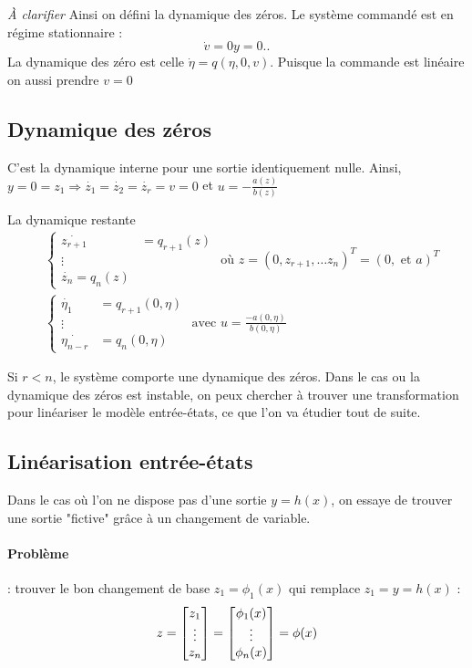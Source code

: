 \documentclass[main.tex]{subfiles}
\begin{document}
\begin{rem}\emph{ À clarifier }
Ainsi on défini la dynamique des zéros. Le système commandé est en régime stationnaire :
\[
\dot{v}=0  y=0 ..
\]
La dynamique des zéro est celle $\dot{\eta} =q(\eta,0,v)$. Puisque la commande est linéaire on aussi prendre $v=0$
\end{rem}
\subsection{Dynamique des zéros}
\begin{defin}
C'est la dynamique interne pour une sortie identiquement nulle.
Ainsi, $y = 0 = z_1 \Rightarrow \dot{z_1} = \dot{z_2} = \dot{z_r} = v = 0$ et $u = -\frac{a(z)}{b(z)}$

La dynamique restante
\begin{align*}
&\left\lbrace
\begin{array}{cc}
\dot{z_{r+1}} & = q_{r+1}(z) \\
\vdots \\
\dot{z_n} = q_n(z)
\end{array}\right. \text{ où } z = (0,z_{r+1},\dots z_n)^T = (0,\text{ et }a)^T\\
& \left\lbrace
\begin{array}{cc}
\dot{\eta_1} & = q_{r+1}(0,\eta) \\
\vdots \\
\dot{\eta_{n-r}} & = q_n(0,\eta)
\end{array} \right. \text{ avec } u = \frac{-a(0,\eta)}{b(0,\eta)}
\end{align*}

\end{defin}

\begin{rem}
Si $r<n$, le système comporte une dynamique des zéros. Dans le cas ou la dynamique des zéros est instable, on peux chercher à trouver une transformation pour linéariser le modèle entrée-états, ce que l'on va étudier tout de suite.
\end{rem}


\subsection{Linéarisation entrée-états}
Dans le cas où l'on ne dispose pas d'une sortie $y=h(x)$, on essaye de trouver une sortie "fictive" grâce à un changement de variable.\\

\paragraph{Problème} : trouver le bon changement de base $z_1 = \phi_1(x)$ qui remplace $z_1=y=h(x)$ :
\[ z = \begin{bmatrix} z_1 \\ \vdots \\ z_n \end{bmatrix} = \begin{bmatrix} \phi_1(x) \\ \vdots \\ \phi_n(x) \end{bmatrix} = \phi(x) \]
\end{document}
